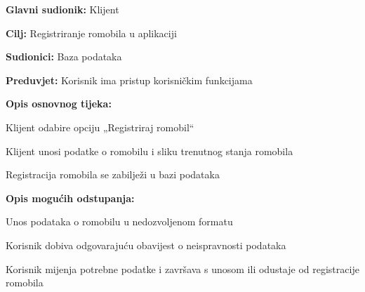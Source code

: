						\noindent {}
						\begin{packed_item}
							
							\item \textbf{Glavni sudionik: }Klijent
							\item  \textbf{Cilj: }Registriranje romobila u aplikaciji
							\item  \textbf{Sudionici: }Baza podataka
							\item  \textbf{Preduvjet: }Korisnik ima pristup korisničkim funkcijama
							\item  \textbf{Opis osnovnog tijeka:}
							
							\item[] \begin{packed_enum}
								
								\item Klijent odabire opciju „Registriraj romobil“ 
								\item Klijent unosi podatke o romobilu i sliku trenutnog stanja romobila 
								\item Registracija romobila se zabilježi u bazi podataka 
								  
							\end{packed_enum}
							
							\item  \textbf{Opis mogućih odstupanja:}
							
							\item[] \begin{packed_item}
								
								\item[2.a] Unos podataka o romobilu u nedozvoljenom formatu 
								\item[] \begin{packed_enum}
									
									\item Korisnik dobiva odgovarajuću obavijest o neispravnosti podataka 
									\item Korisnik mijenja potrebne podatke i završava s unosom ili odustaje od registracije romobila 
									
								\end{packed_enum}
								
								
							\end{packed_item}
						\end{packed_item}
						\noindent {}
